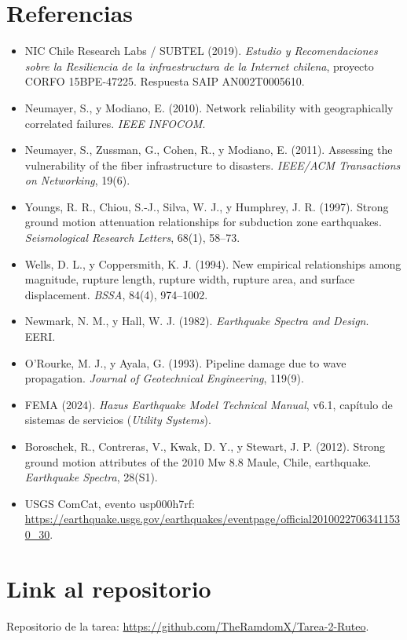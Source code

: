 \documentclass[11pt,a4paper]{article}
\begin{document}
\section*{Referencias}
\begin{itemize}
\item NIC Chile Research Labs / SUBTEL (2019). \emph{Estudio y Recomendaciones sobre la Resiliencia de
la infraestructura de la Internet chilena}, proyecto CORFO 15BPE-47225. Respuesta SAIP AN002T0005610.
\item Neumayer, S., y Modiano, E. (2010). Network reliability with geographically correlated failures.
\emph{IEEE INFOCOM}.
\item Neumayer, S., Zussman, G., Cohen, R., y Modiano, E. (2011). Assessing the vulnerability of the
fiber infrastructure to disasters. \emph{IEEE/ACM Transactions on Networking}, 19(6).
\item Youngs, R. R., Chiou, S.-J., Silva, W. J., y Humphrey, J. R. (1997). Strong ground motion
attenuation relationships for subduction zone earthquakes. \emph{Seismological Research Letters},
68(1), 58--73.
\item Wells, D. L., y Coppersmith, K. J. (1994). New empirical relationships among magnitude, rupture
length, rupture width, rupture area, and surface displacement. \emph{BSSA}, 84(4), 974--1002.
\item Newmark, N. M., y Hall, W. J. (1982). \emph{Earthquake Spectra and Design}. EERI.
\item O'Rourke, M. J., y Ayala, G. (1993). Pipeline damage due to wave propagation. \emph{Journal of
Geotechnical Engineering}, 119(9).
\item FEMA (2024). \emph{Hazus Earthquake Model Technical Manual}, v6.1, capítulo de sistemas de
servicios (\emph{Utility Systems}).
\item Boroschek, R., Contreras, V., Kwak, D. Y., y Stewart, J. P. (2012). Strong ground motion
attributes of the 2010 Mw 8.8 Maule, Chile, earthquake. \emph{Earthquake Spectra}, 28(S1).
\item USGS ComCat, evento usp000h7rf:
\url{https://earthquake.usgs.gov/earthquakes/eventpage/official20100227063411530_30}.
\end{itemize}

\section{Link al repositorio}
Repositorio de la tarea: \url{https://github.com/TheRamdomX/Tarea-2-Ruteo}.
\end{document}
